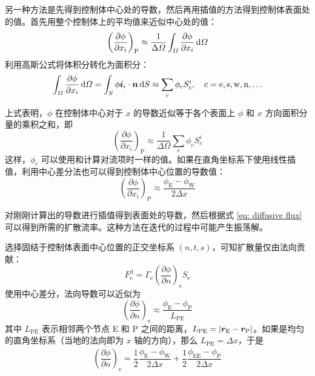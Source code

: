 另一种方法是先得到控制体中心处的导数，然后再用插值的方法得到控制体表面处的值。首先用整个控制体上的平均值来近似中心处的值：
\begin{equation}
	\left(\frac{\partial\phi}{\partial x_i}\right)_{\mathrm{P}} \approx
	\frac{1}{\Delta\varOmega}\int_{\varOmega}\frac{\partial\phi}{\partial x_i}\,\mathrm{d}\varOmega
\end{equation}
利用高斯公式将体积分转化为面积分：
\begin{equation}
	\int_{\varOmega}\frac{\partial\phi}{\partial x_i}\,\mathrm{d}\varOmega =
	\int_S \phi\bm{i}_i\cdot\bm{n}\,\mathrm{d} S \approx \sum_c\phi_c S_c^i,
	\quad c=\mathrm{e,s,w,n,\dots}
\end{equation}

上式表明，$\phi$ 在控制体中心对于 $x$ 的导数近似等于各个表面上 $\phi$ 和 $x$ 方向面积分量的乘积之和，即
\begin{equation}
	\left(\frac{\partial\phi}{\partial x_i}\right)_{\mathrm{P}} \approx
	\frac{1}{\Delta\varOmega}\sum_c\phi_c S_c^i
\end{equation}
这样，$\phi_c$ 可以使用和计算对流项时一样的值。如果在直角坐标系下使用线性插值，利用中心差分法也可以得到控制体中心位置的导数值：
\begin{equation}
	\left(\frac{\partial\phi}{\partial x_i}\right)_{\mathrm{P}} \approx
	\frac{\phi_{\mathrm{E}}-\phi_{\mathrm{W}}}{2\Delta x}
\end{equation}

对刚刚计算出的导数进行插值得到表面处的导数，然后根据式 \eqref{eq: diffusive flux} 可以得到所需的扩散流率。这种方法在迭代的过程中可能产生振荡解。

选择固结于控制体表面中心位置的正交坐标系 $(n,t,s)$，可知扩散量仅由法向贡献：
\begin{equation}\label{eq: diffusive flux of local coordinate}
	F_{\mathrm{e}}^{\mathrm{d}} = \varGamma_{\mathrm{e}}\left(\frac{\partial\phi}{\partial n}\right)_{\mathrm{e}}S_{\mathrm{e}}
\end{equation}
使用中心差分，法向导数可以近似为%
\begin{equation}
	\left(\frac{\partial\phi}{\partial n}\right)_{\mathrm{e}} \approx
	\frac{\phi_{\mathrm{E}}-\phi_{\mathrm{P}}}{L_{\mathrm{PE}}}
\end{equation}
其中 $L_{\mathrm{PE}}$ 表示相邻两个节点 E 和 P 之间的距离，$L_{\mathrm{PE}} = \lvert\bm{r}_{\mathrm{E}}-\bm{r}_{\mathrm{P}}\vert$。如果是均匀的直角坐标系（当地的法向即为 $x$ 轴的方向），那么 $L_{\mathrm{PE}}=\Delta x$，于是
\begin{equation}
	\overline{\left(\frac{\partial\phi}{\partial n}\right)}_{\mathrm{e}} =
	\frac12\frac{\phi_{\mathrm{E}}-\phi_{\mathrm{W}}}{2\Delta x} +
	\frac12\frac{\phi_{\mathrm{EE}}-\phi_{\mathrm{P}}}{2\Delta x}
\end{equation}


